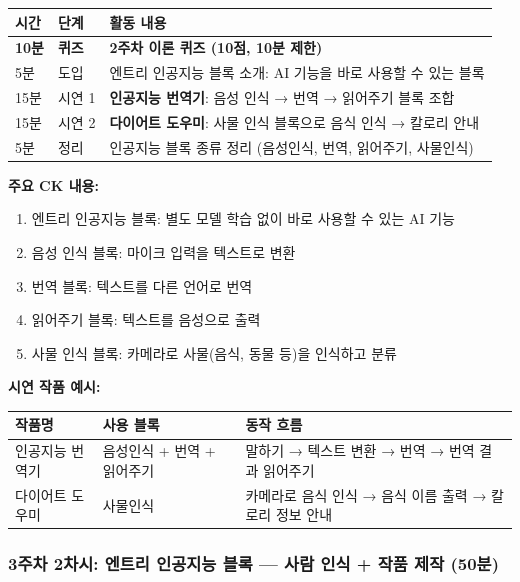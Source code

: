 \documentclass[a4paper,11pt]{article}
\begin{document}
\vspace{0.3em}\noindent
\begin{tabularx}{\textwidth}{|>{\centering\arraybackslash}p{1cm}|>{\centering\arraybackslash}p{1.5cm}|X|}
\hline
\textbf{시간} & \textbf{단계} & \textbf{활동 내용} \\ \hline
\textbf{10분} & \textbf{퀴즈} & \textbf{2주차 이론 퀴즈 (10점, 10분 제한)} \\ \hline
5분 & 도입 & 엔트리 인공지능 블록 소개: AI 기능을 바로 사용할 수 있는 블록 \\ \hline
15분 & 시연 1 & \textbf{인공지능 번역기}: 음성 인식 → 번역 → 읽어주기 블록 조합 \\ \hline
15분 & 시연 2 & \textbf{다이어트 도우미}: 사물 인식 블록으로 음식 인식 → 칼로리 안내 \\ \hline
5분 & 정리 & 인공지능 블록 종류 정리 (음성인식, 번역, 읽어주기, 사물인식) \\ \hline
\end{tabularx}

\textbf{주요 CK 내용:}
\begin{enumerate}[nosep,start=18]
\item 엔트리 인공지능 블록: 별도 모델 학습 없이 바로 사용할 수 있는 AI 기능
\item 음성 인식 블록: 마이크 입력을 텍스트로 변환
\item 번역 블록: 텍스트를 다른 언어로 번역
\item 읽어주기 블록: 텍스트를 음성으로 출력
\item 사물 인식 블록: 카메라로 사물(음식, 동물 등)을 인식하고 분류
\end{enumerate}

\textbf{시연 작품 예시:}

\noindent
\begin{tabularx}{\textwidth}{|p{2.8cm}|p{3.3cm}|X|}
\hline
\textbf{작품명} & \textbf{사용 블록} & \textbf{동작 흐름} \\ \hline
인공지능 번역기 & 음성인식 + 번역 + 읽어주기 & 말하기 → 텍스트 변환 → 번역 → 번역 결과 읽어주기 \\ \hline
다이어트 도우미 & 사물인식 & 카메라로 음식 인식 → 음식 이름 출력 → 칼로리 정보 안내 \\ \hline
\end{tabularx}

\subsubsection{3주차 2차시: 엔트리 인공지능 블록 --- 사람 인식 + 작품 제작 (50분)}
\end{document}
